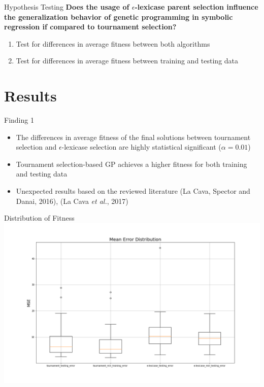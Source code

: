 \documentclass[
  ignorenonframetext,
]{beamer}
\providecommand{\tightlist}{%
  \setlength{\itemsep}{0pt}\setlength{\parskip}{0pt}}
\begin{document}
\begin{frame}{Hypothesis Testing}
\protect\hypertarget{hypothesis-testing}{}
\textbf{Does the usage of \(\epsilon\)-lexicase parent selection
influence the generalization behavior of genetic programming in symbolic
regression if compared to tournament selection?}

\begin{enumerate}
\tightlist
\item
  Test for differences in average fitness between both algorithms
\item
  Test for differences in average fitness between training and testing
  data
\end{enumerate}
\end{frame}

\hypertarget{results}{%
\section{Results}\label{results}}

\begin{frame}{Finding 1}
\protect\hypertarget{finding-1}{}
\begin{itemize}
\tightlist
\item
  The differences in average fitness of the final solutions between
  tournament selection and \(\epsilon\)-lexicase selection are highly
  statistical significant (\(\alpha=0.01\))
\item
  Tournament selection-based GP achieves a higher fitness for both
  training and testing data
\item
  Unexpected results based on the reviewed literature (La Cava, Spector
  and Danai, 2016), (La Cava \emph{et al.}, 2017)
\end{itemize}
\end{frame}

\begin{frame}{Distribution of Fitness}
\protect\hypertarget{distribution-of-fitness}{}
\includegraphics{../plots/mean_error_boxplot_all.png}
\end{frame}
\end{document}
